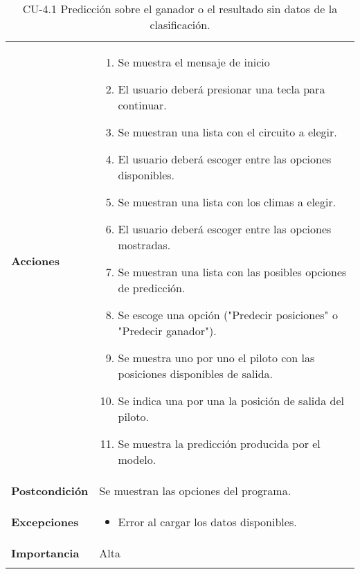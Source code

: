 \begin{longtable}[h!]{@{}ll@{}}
\begin{minipage}[t]{0.23\columnwidth}
\textbf{Acciones}\strut
\end{minipage} & \begin{minipage}[t]{0.71\columnwidth}\raggedright\strut
\begin{enumerate}
\def\labelenumi{\arabic{enumi}.}
\tightlist
\item 
  Se muestra  el mensaje de inicio
\item
  El usuario deberá presionar una tecla para continuar.
\item
  Se muestran una lista con el circuito a elegir.
\item
  El usuario deberá escoger entre las opciones disponibles.
\item
  Se muestran una lista con los climas a elegir.
\item
  El usuario deberá escoger entre las opciones mostradas.
\item
  Se muestran una lista con las posibles opciones de predicción.
\item
  Se escoge una opción ("Predecir posiciones" o "Predecir ganador").
\item
  Se muestra uno por uno el piloto con las posiciones disponibles de salida.
\item
  Se indica una por una la posición de salida del piloto.
\item
  Se muestra la predicción producida por el modelo.
\end{enumerate}\strut
\end{minipage}\tabularnewline
\begin{minipage}[t]{0.23\columnwidth}\raggedright\strut
\textbf{Postcondición}\strut
\end{minipage} & \begin{minipage}[t]{0.71\columnwidth}\raggedright\strut
Se muestran las opciones del programa.\strut
\end{minipage}\tabularnewline
\begin{minipage}[t]{0.23\columnwidth}\raggedright\strut
\textbf{Excepciones}\strut
\end{minipage} & \begin{minipage}[t]{0.71\columnwidth}\raggedright\strut
\begin{itemize}
\tightlist
\item
  Error al cargar los datos disponibles.
\end{itemize}\strut
\end{minipage}\tabularnewline
\begin{minipage}[t]{0.23\columnwidth}\raggedright\strut
\textbf{Importancia}\strut
\end{minipage} & \begin{minipage}[t]{0.71\columnwidth}\raggedright\strut
Alta\strut
\end{minipage}\tabularnewline
\bottomrule
\caption{CU-4.1 Predicción sobre el ganador o el resultado sin datos de la clasificación.}
\end{longtable}

